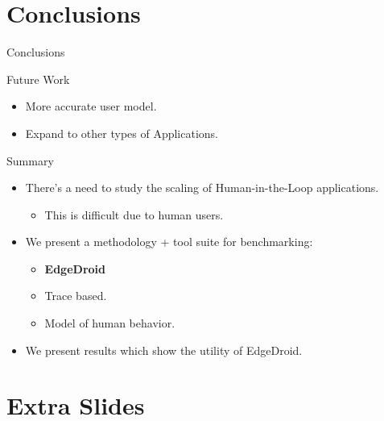 \documentclass[aspectratio=1610]{beamer}
\begin{document}
\section{Conclusions}
\begin{frame}{Conclusions}
    \begin{block}{Future Work}
        \begin{itemize}
            \itemsep1em
            \item More accurate user model.
            \item Expand to other types of Applications.
        \end{itemize}
    \end{block}

    \begin{block}{Summary}
        \begin{itemize}
            \itemsep1em
            \item There's a need to study the scaling of Human-in-the-Loop applications.
                  \begin{itemize}
                      \item This is difficult due to human users.
                  \end{itemize}
            \item We present a methodology + tool suite for benchmarking:
                  \begin{itemize}
                      \item \textbf{EdgeDroid}
                      \item Trace based.
                      \item Model of human behavior.
                  \end{itemize}
            \item We present results which show the utility of EdgeDroid.
        \end{itemize}
    \end{block}
\end{frame}

\startpage
\section{Extra Slides}
\begin{frame}{}
\end{frame}
\end{document}
